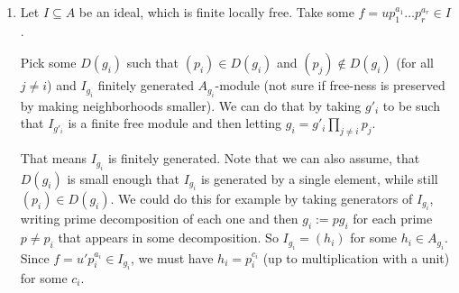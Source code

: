 \newcommand{\sheet}{8}




\maketitle{}

\begin{exercise}{1}
    \begin{enumerate}
        \item{

                Let $I \subseteq A$ be an ideal, which is finite locally free.
                Take some $f = u p^{a_1}_1 \dots p^{a_r}_r \in I$.

                Pick some $D(g_i)$ such that $(p_i) \in D(g_i)$ and $(p_j)
                \notin D(g_i)$ (for all $j \not= i$) and $I_{g_i}$ finitely
                generated $A_{g_i}$-module (not sure if free-ness is preserved
                by making neighborhoods smaller). We can do that by taking
                $g'_i$ to be such that $I_{g'_i}$ is a finite free module and
                then letting $g_i = g'_i \prod_{j \not= i} p_j$.

                That means $I_{g_i}$ is finitely generated.
                Note that we can also assume, that $D(g_i)$ is small enough that
                $I_{g_i}$ is generated by a single element, while still $(p_i) \in
                D(g_i)$. %
                We could do this for example by taking generators of $I_{g_i}$,
                writing prime decomposition of each one and then
                $g_i := p g_i$ for each prime $p \not= p_i$ that appears in some
                decomposition.
                So $I_{g_i} = (h_i)$ for some $h_i \in A_{g_i}$. Since $f = u'
                p^{a_i}_i \in I_{g_i}$, we must have $h_i = p^{c_i}_i$ (up to
                multiplication with a unit) for some $c_i$.

}
\end{enumerate}
\end{exercise}
